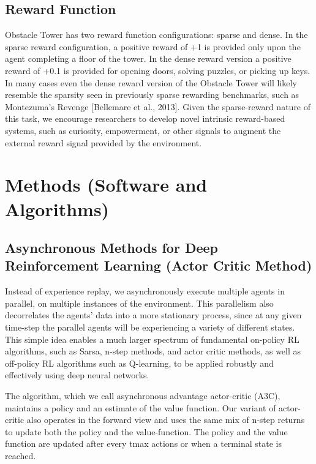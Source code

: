 \documentclass[conference]{IEEEtran}
\begin{document}
\subsection{\textbf{Reward Function}}
Obstacle Tower has two reward function configurations: sparse and dense. In the sparse reward configuration, a positive reward of +1 is provided only upon the agent completing a floor of the tower. In the dense reward version a positive reward of +0.1 is provided for opening doors, solving puzzles, or picking up keys. In many cases even the dense reward version of the Obstacle Tower will likely resemble the sparsity seen in previously sparse rewarding benchmarks, such as Montezuma’s Revenge [Bellemare et al., 2013]. Given the sparse-reward nature of this task, we encourage researchers to develop novel intrinsic reward-based systems, such as curiosity, empowerment, or other signals to augment the external reward signal provided by the environment.

\section{Methods (Software and Algorithms)}

\subsection{\textbf{Asynchronous Methods for Deep Reinforcement Learning (Actor Critic Method)}}

Instead of experience replay, we asynchronously execute multiple agents in parallel, on multiple instances of the environment. This parallelism also decorrelates the agents’ data into a more stationary process, since at any given time-step the parallel agents will be experiencing a variety of different states. This simple idea enables a much larger spectrum of fundamental on-policy RL algorithms, such as Sarsa, n-step methods, and actor critic methods, as well as off-policy RL algorithms such as Q-learning, to be applied robustly and effectively using deep neural networks.

The algorithm, which we call asynchronous advantage actor-critic (A3C), maintains a policy and an estimate of the value function. Our variant of actor-critic also operates in the forward view and uses the same mix of n-step returns to update both the policy and the value-function. The policy and the value function are updated after every tmax actions or when a terminal state is reached.
\end{document}
